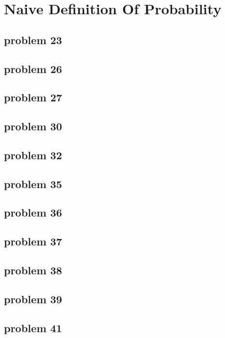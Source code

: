 \section{Naive Definition Of Probability}

\subsection{problem 23}


\subsection{problem 26}


\subsection{problem 27}


\subsection{problem 30}


\subsection{problem 32}


\subsection{problem 35}


\subsection{problem 36}


\subsection{problem 37}


\subsection{problem 38}


\subsection{problem 39}


\subsection{problem 41}
